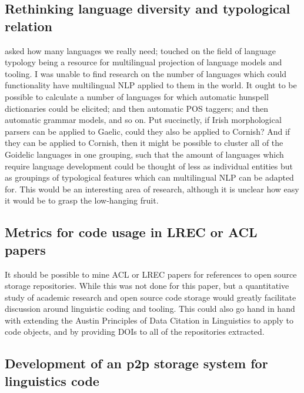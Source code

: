 \subsection{Rethinking language diversity and typological relation}

\citet{ginsburgh2011many} asked how many languages we really need; \citet{bender2010grand, bender2016linguistic} touched on the field of language typology being a resource for multilingual projection of language models and tooling. I was unable to find research on the number of languages which could functionality have multilingual NLP applied to them in the world. It ought to be possible to calculate a number of languages for which automatic hunspell dictionaries could be elicited; and then automatic POS taggers; and then automatic grammar models, and so on. Put succinctly, if Irish morphological parsers can be applied to Gaelic, could they also be applied to Cornish? And if they can be applied to Cornish, then it might be possible to cluster all of the Goidelic languages in one grouping, such that the amount of languages which require language development could be thought of less as individual entities but as groupings of typological features which can multilingual NLP can be adapted for. This would be an interesting area of research, although it is unclear how easy it would be to grasp the low-hanging fruit.

\subsection{Metrics for code usage in LREC or ACL papers}

It should be possible to mine ACL or LREC papers for references to open source storage repositories. While this was not done for this paper, but a quantitative study of academic research and open source code storage would greatly facilitate discussion around linguistic coding and tooling. This could also go hand in hand with extending the Austin Principles of Data Citation in Linguistics \citet{AustinPrinciples2017} to apply to code objects, and by providing DOIs to all of the repositories extracted.

\subsection{Development of an p2p storage system for linguistics code}

